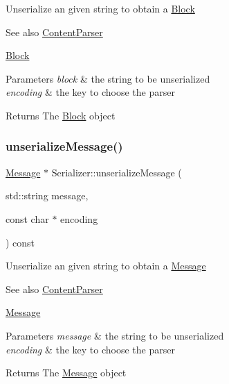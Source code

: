 Unserialize an given string to obtain a \mbox{\hyperlink{classBlock}{Block}} \begin{DoxySeeAlso}{See also}
\mbox{\hyperlink{classContentParser}{Content\+Parser}} 

\mbox{\hyperlink{classBlock}{Block}}
\end{DoxySeeAlso}

\begin{DoxyParams}{Parameters}
{\em block} & the string to be unserialized \\
\hline
{\em encoding} & the key to choose the parser \\
\hline
\end{DoxyParams}
\begin{DoxyReturn}{Returns}
The \mbox{\hyperlink{classBlock}{Block}} object 
\end{DoxyReturn}
\mbox{\label{classSerializer_a1d16df9f35a7580da06a497dfbddffe8}} 
\subsubsection{\texorpdfstring{unserialize\+Message()}{unserializeMessage()}}
{\footnotesize\ttfamily \mbox{\hyperlink{classMessage}{Message}} $\ast$ Serializer\+::unserialize\+Message (\begin{DoxyParamCaption}\item[{std\+::string}]{message,  }\item[{const char $\ast$}]{encoding }\end{DoxyParamCaption}) const\hspace{0.3cm}{\ttfamily [virtual]}}

Unserialize an given string to obtain a \mbox{\hyperlink{classMessage}{Message}} \begin{DoxySeeAlso}{See also}
\mbox{\hyperlink{classContentParser}{Content\+Parser}} 

\mbox{\hyperlink{classMessage}{Message}}
\end{DoxySeeAlso}

\begin{DoxyParams}{Parameters}
{\em message} & the string to be unserialized \\
\hline
{\em encoding} & the key to choose the parser \\
\hline
\end{DoxyParams}
\begin{DoxyReturn}{Returns}
The \mbox{\hyperlink{classMessage}{Message}} object 
\end{DoxyReturn}
\mbox{\label{classSerializer_a64b858f0c2968e888cf796b6f09eed7b}} 
